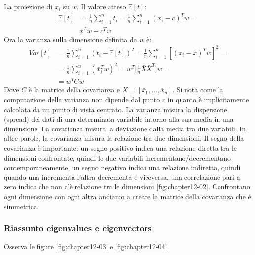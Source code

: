 La proiezione di $x_i$ su $w$.
Il valore atteso $\mathbb{E}[t]$:
\begin{align*}
	\mathbb{E}[t] &= \frac{1}{n}\sum\limits_{i=1}^nt_i = \frac{1}{n}\sum\limits_{i=1}^n(x_i-c)^Tw=\\
	&\bar{x}^Tw-c^Tw
\end{align*}
Ora la varianza sulla dimensione definita da $w$ \`e:
\begin{align*}
	Var[t] &= \frac{1}{n}\sum\limits_{i = 1}^n(t_i -\mathbb{E}[t])^2 = \frac{1}{n}\sum\limits_{i=1}^n[(x_i-\bar{x})^Tw]^2=\\
	&=\frac{1}{n}\sum\limits_{i=1}^n(\bar{x}_i^Tw)^2 = w^T\bigl[\frac{1}{n}\bar{X}\bar{X}^T\bigr]w=\\
	&=w^TCw
\end{align*}
Dove $C$ \`e la matrice della covarianza e $X = [\bar{x}_1,\dots,\bar{x}_n]$.
Si nota come la computazione della varianza non dipende dal punto $c$ in quanto \`e implicitamente calcolata da un punto di vista centrato. La varianza misura la dispersione (spread) dei dati di una determinata variabile intorno alla sua media in una dimensione. La covarianza misura la deviazione dalla media tra due variabili. In altre parole, la covarianza misura la relazione tra due dimensioni. Il segno della covarianza \`e importante: un segno positivo indica una relazione diretta tra le dimensioni confrontate, quindi le due variabili incrementano/decrementano contemporaneamente, un segno negativo indica una relazione indiretta, quindi quando una incrementa l'altra decrementa e viceversa, una correlazione pari a zero indica che non c'\`e relazione tra le dimensioni  \ref{fig:chapter12-02}. Confrontano ogni dimensione con ogni altra andiamo a creare la matrice della covarianza che \`e simmetrica.

\subsubsection{Riassunto eigenvalues e eigenvectors}

Osserva le figure \ref{fig:chapter12-03} e \ref{fig:chapter12-04}.

